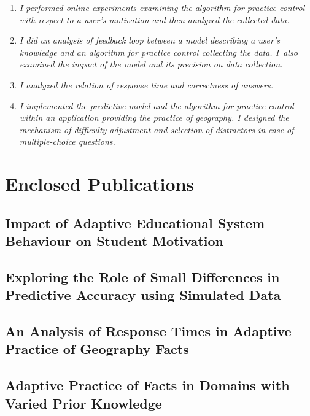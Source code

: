 \documentclass[table,color,cover,twoside,nolot,nolof]{fithesis3/fithesis3}
\begin{document}
\begin{enumerate}
	\item {}

		\textit{I performed online experiments examining the algorithm for practice
			control with respect to a user's motivation and then analyzed the collected
			data.}
	\item {}

		\textit{I did an analysis of feedback loop between a model describing
			a user's knowledge and an algorithm for practice control collecting the
			data. I~also examined the impact of the model and its precision on data
			collection.}
	\item {}

		\textit{I analyzed the relation of response time and correctness of answers.}

	\item {}

		\textit{I implemented the predictive model and the algorithm for practice
			control within an application providing the practice of geography. I designed
			the mechanism of difficulty adjustment and selection of distractors in case of
			multiple-choice questions.}
\end{enumerate}




\appendix
\chapter{Enclosed Publications}
\section{Impact of Adaptive Educational System Behaviour on Student Motivation}

\section{Exploring the Role of Small Differences in Predictive Accuracy using  Simulated Data}

\section{An Analysis of Response Times in Adaptive Practice of Geography Facts}

\section{Adaptive Practice of Facts in Domains with Varied Prior Knowledge}

\end{document}
